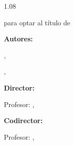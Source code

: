 \begin{titlepage}
  \centering
  \begin{spacing}{1.08}
    \vspace*{0.3cm}

    {\fontsize{14}{18}\selectfont\bfseries
      \MakeUppercase{\TituloTrabajo}\par}

    \vspace{1.0cm}

    {\large
      \TipoDocumento\par
      para optar al título de\par
      \textit{\TituloObtenido}\par}

    \vspace{0.75cm}

    {\large
      \textbf{Autores:}\par
      \AutorUno, \CodigoAutorUno\par
      \AutorDos, \CodigoAutorDos\par}

    \vspace{0.65cm}

    {\large
      \textbf{Director:}\par
      Profesor: \DirectorNombre, \DirectorTitulo\par
      \DirectorFormacion\par}

    \vspace{0.55cm}

    {\large
      \textbf{Codirector:}\par
      Profesor: \CodirectorNombre, \CodirectorTitulo\par
      \CodirectorFormacion\par}

    \vspace{0.8cm}

    \LogoUIS[3.5cm]

    \vfill

    {\large\MakeUppercase{\BloqueInstitucional}}
  \end{spacing}
\end{titlepage}
